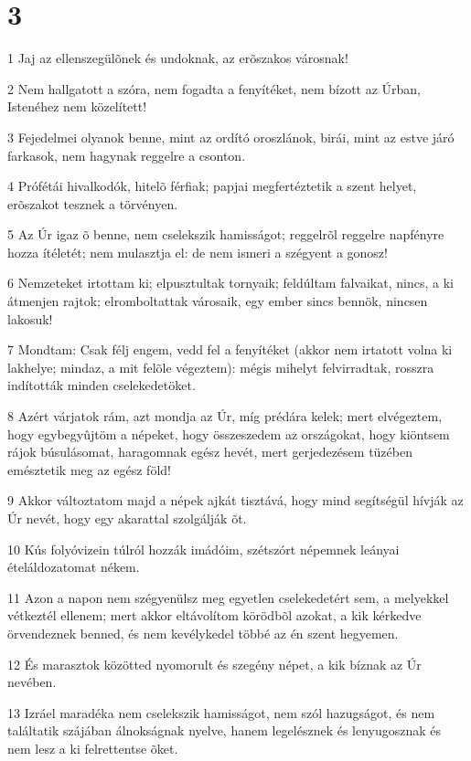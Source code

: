 \chapter{3}

\par 1 Jaj az ellenszegülõnek és undoknak, az erõszakos városnak!
\par 2 Nem hallgatott a szóra, nem fogadta a fenyítéket, nem bízott az Úrban, Istenéhez nem közelített!
\par 3 Fejedelmei olyanok benne, mint az ordító oroszlánok, birái, mint az estve járó farkasok, nem hagynak reggelre a csonton.
\par 4 Prófétái hivalkodók, hitelõ férfiak; papjai megfertéztetik a szent helyet, erõszakot tesznek a törvényen.
\par 5 Az Úr igaz õ benne, nem cselekszik hamisságot; reggelrõl reggelre napfényre hozza ítéletét; nem mulasztja el: de nem ismeri a szégyent a gonosz!
\par 6 Nemzeteket irtottam ki; elpusztultak tornyaik; feldúltam falvaikat, nincs, a ki átmenjen rajtok; elromboltattak városaik, egy ember sincs bennök, nincsen lakosuk!
\par 7 Mondtam: Csak félj engem, vedd fel a fenyítéket (akkor nem irtatott volna ki lakhelye; mindaz, a mit felõle végeztem): mégis mihelyt felvirradtak, rosszra indították minden cselekedetöket.
\par 8 Azért várjatok rám, azt mondja az Úr, míg prédára kelek; mert elvégeztem, hogy egybegyûjtöm a népeket, hogy összeszedem az országokat, hogy kiöntsem rájok búsulásomat, haragomnak egész hevét, mert gerjedezésem tüzében emésztetik meg az egész föld!
\par 9 Akkor változtatom majd a népek ajkát tisztává, hogy mind segítségül hívják az Úr nevét, hogy egy akarattal szolgálják õt.
\par 10 Kús folyóvizein túlról hozzák imádóim, szétszórt népemnek leányai ételáldozatomat nékem.
\par 11 Azon a napon nem szégyenülsz meg egyetlen cselekedetért sem, a melyekkel vétkeztél ellenem; mert akkor eltávolítom körödbõl azokat, a kik kérkedve örvendeznek benned, és nem kevélykedel többé az én szent hegyemen.
\par 12 És marasztok közötted nyomorult és szegény népet, a kik bíznak az Úr nevében.
\par 13 Izráel maradéka nem cselekszik hamisságot, nem szól hazugságot, és nem találtatik szájában álnokságnak nyelve, hanem legelésznek és lenyugosznak és nem lesz a ki felrettentse õket.
